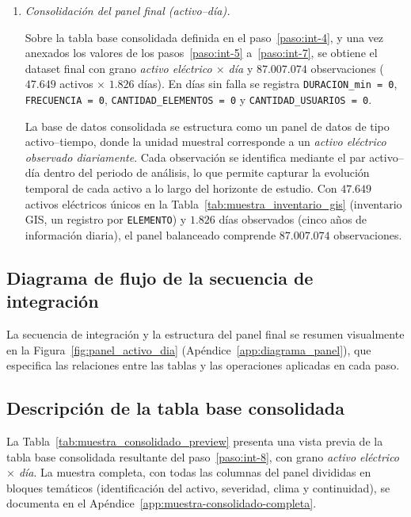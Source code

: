 {\begin{enumerate}
        \item\label{paso:int-8} \textit{Consolidación del panel final (activo--día).}\mbox{}\par\vspace{0.2em}\noindent
        Sobre la tabla base consolidada definida en el paso~\ref{paso:int-4}, y una vez anexados los valores de los pasos~\ref{paso:int-5} a~\ref{paso:int-7}, se obtiene el dataset final con grano \textit{activo eléctrico $\times$ día} y $87{.}007{.}074$ observaciones ($47{.}649$ activos $\times$ $1{.}826$ días). En días sin falla se registra \texttt{DURACION\_min = 0}, \texttt{FRECUENCIA = 0}, \texttt{CANTIDAD\_ELEMENTOS = 0} y \texttt{CANTIDAD\_USUARIOS = 0}.
    
        La base de datos consolidada se estructura como un panel de datos de tipo activo–tiempo, donde la unidad muestral corresponde a un \textit{activo eléctrico observado diariamente}. Cada observación se identifica mediante el par activo--día dentro del periodo de análisis, lo que permite capturar la evolución temporal de cada activo a lo largo del horizonte de estudio. Con $47{.}649$ activos eléctricos únicos en la Tabla~\ref{tab:muestra_inventario_gis} (inventario GIS, un registro por \texttt{ELEMENTO}) y $1{.}826$ días observados (cinco años de información diaria), el panel balanceado comprende $87{.}007{.}074$ observaciones.
    
    
\end{enumerate}
    }
    
    
\subsection{Diagrama de flujo de la secuencia de integración}
    La secuencia de integración y la estructura del panel final se resumen visualmente en la Figura~\ref{fig:panel_activo_dia} (Apéndice~\ref{app:diagrama_panel}), que especifica las relaciones entre las tablas y las operaciones aplicadas en cada paso.


\subsection{Descripción de la tabla base consolidada}
    La Tabla~\ref{tab:muestra_consolidado_preview} presenta una vista previa de la tabla base consolidada resultante del paso~\ref{paso:int-8}, con grano \textit{activo eléctrico $\times$ día}. La muestra completa, con todas las columnas del panel divididas en bloques temáticos (identificación del activo, severidad, clima y continuidad), se documenta en el Apéndice~\ref{app:muestra-consolidado-completa}.

